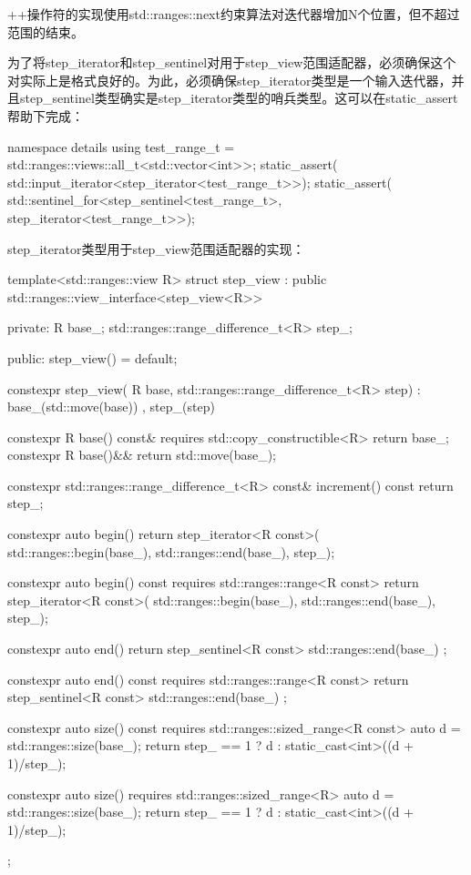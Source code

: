 ++操作符的实现使用std::ranges::next约束算法对迭代器增加N个位置，但不超过范围的结束。

为了将step\_iterator和step\_sentinel对用于step\_view范围适配器，必须确保这个对实际上是格式良好的。为此，必须确保step\_iterator类型是一个输入迭代器，并且step\_sentinel类型确实是step\_iterator类型的哨兵类型。这可以在static\_assert帮助下完成：

\begin{cpp}
namespace details
{
	using test_range_t =
		std::ranges::views::all_t<std::vector<int>>;
	static_assert(
		std::input_iterator<step_iterator<test_range_t>>);
	static_assert(
		std::sentinel_for<step_sentinel<test_range_t>,
		step_iterator<test_range_t>>);
}
\end{cpp}

step\_iterator类型用于step\_view范围适配器的实现：

\begin{cpp}
template<std::ranges::view R>
struct step_view :
	public std::ranges::view_interface<step_view<R>>
{
private:
	R base_;
	std::ranges::range_difference_t<R> step_;
	
public:
	step_view() = default;
	
	constexpr step_view(
		R base,
		std::ranges::range_difference_t<R> step)
			: base_(std::move(base))
			, step_(step)
	{
	}

	constexpr R base() const&
		requires std::copy_constructible<R>
	{ return base_; }
	constexpr R base()&& { return std::move(base_); }
	
	constexpr std::ranges::range_difference_t<R> const&
	increment() const
	{ return step_; }
	
	constexpr auto begin()
	{
		return step_iterator<R const>(
			std::ranges::begin(base_),
			std::ranges::end(base_), step_);
	}

	constexpr auto begin() const
	requires std::ranges::range<R const>
	{
		return step_iterator<R const>(
			std::ranges::begin(base_),
			std::ranges::end(base_), step_);
	}

	constexpr auto end()
	{
		return step_sentinel<R const>{
			std::ranges::end(base_) };
	}

	constexpr auto end() const
	requires std::ranges::range<R const>
	{
		return step_sentinel<R const>{
			std::ranges::end(base_) };
	}

	constexpr auto size() const
	requires std::ranges::sized_range<R const>
	{
		auto d = std::ranges::size(base_);
		return step_ == 1 ? d :
			static_cast<int>((d + 1)/step_); 
	}
	
	constexpr auto size()
	requires std::ranges::sized_range<R>
	{
		auto d = std::ranges::size(base_);
		return step_ == 1 ? d :
			static_cast<int>((d + 1)/step_);
	}
};
\end{cpp}


